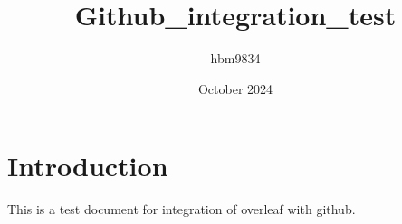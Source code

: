 \documentclass{article}
\title{Github_integration_test}
\author{hbm9834 }
\date{October 2024}
\begin{document}
\maketitle

\section{Introduction}
This is a test document for integration of overleaf with github.
\end{document}
